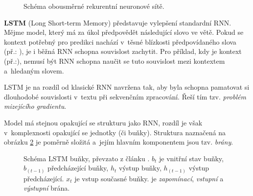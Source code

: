 \begin{figure}[hbt]
    \centering
	\caption{Schéma obousměrné rekurentní neuronové sítě.}
	\label{bidirRNN}
\end{figure}

\pagebreak\textbf{LSTM} (Long Short-term Memory) představuje vylepšení standardní RNN. Mějme model, který má za úkol předpovědět následující slovo ve větě. Pokud se kontext potřebný pro predikci nachází v~těsné blízkosti předpovídaného slova (př.: ), je i běžná RNN schopna souvislost zachytit. Pro příklad, kdy je kontext  (př.:), nemusí být RNN schopna naučit se tuto souvislost mezi kontextem a~hledaným slovem.\par \smallskip
LSTM je  na rozdíl od klasické RNN navržena tak, aby byla schopna pamatovat si dlouhodobé souvislosti v~textu při sekvenčním zpracování. Řeší tím tzv. \emph{problém mizejícího gradientu}.\par
Model má stejnou opakující se strukturu jako RNN, rozdíl je však v~komplexnosti opakující se jednotky (či buňky). Struktura naznačená na obrázku \ref{lstm_cell} je poměrně složitá a~jejím hlavním komponentem jsou tzv. \emph{brány}. 

\begin{figure}[hbt]
    \centering
	\caption{Schéma LSTM buňky, převzato z článku \cite{understandingLSTM}. $b_t$ je vnitřní stav buňky, $b_{(t-1)}$ předcházející buňky, $h_t$ výstup buňky, $h_{(t-1)}$ výstup předcházející. $x_t$ je vstup současné buňky.  je \emph{zapomínací},  \emph{vstupní} a  \emph{výstupní} brána.}
	\label{lstm_cell}
\end{figure}

